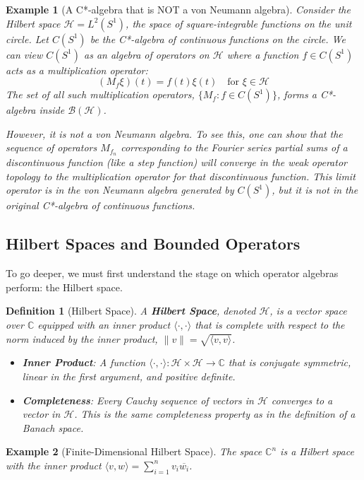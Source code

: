 \documentclass[11pt, a4paper]{article}
\theoremstyle{colored_def}
\newtheorem{definition}{Definition}[section]
\theoremstyle{colored_thm}
\theoremstyle{colored_ex}
\newtheorem{example}{Example}[section]
\newcommand{\C}{\mathbb{C}}
\newcommand{\Hil}{\mathcal{H}}
\newcommand{\B}{\mathcal{B}}
\begin{document}
\begin{example}[A C*-algebra that is NOT a von Neumann algebra]\label{ex:cstar-not-vna}
Consider the Hilbert space $\Hil = L^2(S^1)$, the space of square-integrable functions on the unit circle. Let $C(S^1)$ be the C*-algebra of continuous functions on the circle. We can view $C(S^1)$ as an algebra of operators on $\Hil$ where a function $f \in C(S^1)$ acts as a multiplication operator:
$$ (M_f \xi)(t) = f(t)\xi(t) \quad \text{for } \xi \in \Hil $$
The set of all such multiplication operators, $\{M_f : f \in C(S^1)\}$, forms a C*-algebra inside $\B(\Hil)$.

However, it is not a von Neumann algebra. To see this, one can show that the sequence of operators $M_{f_n}$ corresponding to the Fourier series partial sums of a discontinuous function (like a step function) will converge in the weak operator topology to the multiplication operator for that discontinuous function. This limit operator is in the von Neumann algebra generated by $C(S^1)$, but it is not in the original C*-algebra of continuous functions.
\end{example}

\subsection{Hilbert Spaces and Bounded Operators}

To go deeper, we must first understand the stage on which operator algebras perform: the Hilbert space.

\begin{definition}[Hilbert Space]
A \textbf{Hilbert Space}, denoted $\Hil$, is a vector space over $\C$ equipped with an inner product $\langle \cdot, \cdot \rangle$ that is complete with respect to the norm induced by the inner product, $\|v\| = \sqrt{\langle v, v \rangle}$.
\begin{itemize}
    \item \textbf{Inner Product}: A function $\langle \cdot, \cdot \rangle: \Hil \times \Hil \to \C$ that is conjugate symmetric, linear in the first argument, and positive definite.
    \item \textbf{Completeness}: Every Cauchy sequence of vectors in $\Hil$ converges to a vector in $\Hil$. This is the same completeness property as in the definition of a Banach space.
\end{itemize}
\end{definition}

\begin{example}[Finite-Dimensional Hilbert Space]
The space $\C^n$ is a Hilbert space with the inner product $\langle v, w \rangle = \sum_{i=1}^n v_i \overline{w_i}$.
\end{example}
\end{document}
